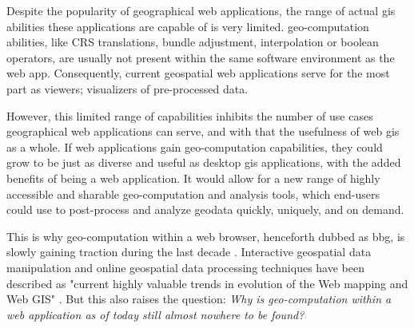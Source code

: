 Despite the popularity of geographical web applications, the range of actual \ac{gis} abilities these applications are capable of is very limited. \ac{geo-computation} abilities, like CRS translations, bundle adjustment, interpolation or boolean operators, are usually not present within the same software environment as the web app. Consequently, current geospatial web applications serve for the most part as viewers; visualizers of pre-processed data. 

However, this limited range of capabilities inhibits the number of use cases geographical web applications can serve, and with that the usefulness of web \ac{gis} as a whole.
If web applications gain \ac{geo-computation} capabilities, they could grow to be just as diverse and useful as desktop \ac{gis} applications, with the added benefits of being a web application. It would allow for a new range of highly accessible and sharable geo-computation and analysis tools, which end-users could use to post-process and analyze geodata quickly, uniquely, and on demand.

This is why \ac{geo-computation} within a web browser, henceforth dubbed as \ac{bbg}, is slowly gaining traction during the last decade \cite{kulawiak_analysis_2019, panidi_hybrid_2015, hamilton_client-side_2014}. 
Interactive geospatial data manipulation and online geospatial data processing techniques have been described as "current highly valuable trends in evolution of the Web mapping and Web GIS" \cite{panidi_hybrid_2015}. 
But this also raises the question: \textit{Why is geo-computation within a web application as of today still almost nowhere to be found?} 




